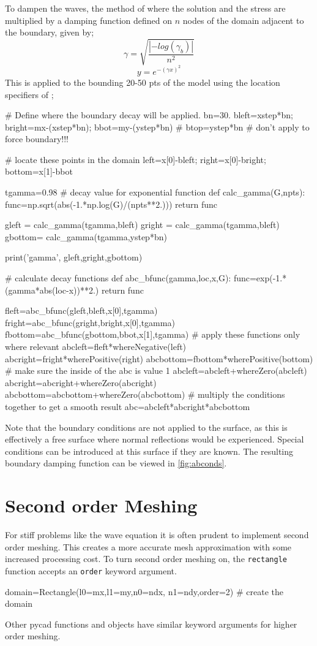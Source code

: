 To dampen the waves, the method of \citet{Cerjan1985}
where the solution and the stress are multiplied by a damping function defined
on $n$ nodes of the domain adjacent to the boundary, given by;
\begin{equation}
\gamma =\sqrt{\frac{| -log( \gamma _{b} ) |}{n^2}}
\end{equation}
\begin{equation}
y=e^{-(\gamma x)^2}
\end{equation}
This is applied to the bounding 20-50 pts of the model using the location
specifiers of \esc;
\begin{python}
# Define where the boundary decay will be applied.
bn=30.
bleft=xstep*bn; bright=mx-(xstep*bn); bbot=my-(ystep*bn)
# btop=ystep*bn # don't apply to force boundary!!!

# locate these points in the domain
left=x[0]-bleft; right=x[0]-bright; bottom=x[1]-bbot

tgamma=0.98   # decay value for exponential function
def calc_gamma(G,npts):
    func=np.sqrt(abs(-1.*np.log(G)/(npts**2.)))
    return func

gleft  = calc_gamma(tgamma,bleft)
gright = calc_gamma(tgamma,bleft)
gbottom= calc_gamma(tgamma,ystep*bn)

print('gamma', gleft,gright,gbottom)

# calculate decay functions
def abc_bfunc(gamma,loc,x,G):
    func=exp(-1.*(gamma*abs(loc-x))**2.)
    return func

fleft=abc_bfunc(gleft,bleft,x[0],tgamma)
fright=abc_bfunc(gright,bright,x[0],tgamma)
fbottom=abc_bfunc(gbottom,bbot,x[1],tgamma)
# apply these functions only where relevant
abcleft=fleft*whereNegative(left)
abcright=fright*wherePositive(right)
abcbottom=fbottom*wherePositive(bottom)
# make sure the inside of the abc is value 1
abcleft=abcleft+whereZero(abcleft)
abcright=abcright+whereZero(abcright)
abcbottom=abcbottom+whereZero(abcbottom)
# multiply the conditions together to get a smooth result
abc=abcleft*abcright*abcbottom
\end{python}
Note that the boundary conditions are not applied to the surface, as this is
effectively a free surface where normal reflections would be experienced.
Special conditions can be introduced at this surface if they are known. The
resulting boundary damping function can be viewed in
\autoref{fig:abconds}.

\section{Second order Meshing}
For stiff problems like the wave equation it is often prudent to implement
second order meshing. This creates a more accurate mesh approximation with some
increased processing cost. To turn second order meshing on, the \verb!rectangle!
function accepts an \verb!order! keyword argument.
\begin{python}
domain=Rectangle(l0=mx,l1=my,n0=ndx, n1=ndy,order=2) # create the domain
\end{python}
Other pycad functions and objects have similar keyword arguments for higher
order meshing.

